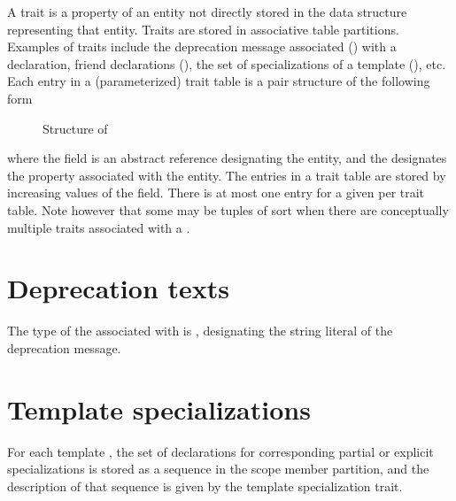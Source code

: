 \label{sec:ifc-traits}

A trait is a property of an entity not directly stored in the data structure representing that entity.
Traits are stored in associative table partitions.  Examples of traits include the deprecation 
message associated () with a declaration,
friend declarations (), the set of specializations of a 
template (), etc.
 Each entry in a (parameterized) trait table is a pair structure of the following form
\begin{figure}[H]
	\centering
	\caption{Structure of }
	\label{fig:ifc-associated-trait-structure}
\end{figure}
%
where the  field is an abstract reference designating the entity, and the  designates the property associated with the entity.
The entries in a trait table are stored by increasing values of the  field.  There is at most one entry for a given  per trait
table.  Note however that some  may be tuples of sort  when there are conceptually multiple traits associated with a .

\section{Deprecation texts}
\label{sec:ifc-deprecated-trait}

The type  of the  associated with  is , designating
the string literal of the deprecation message.




\section{Template specializations}
\label{sec:ifc-specialization-trait}

For each template , the set of declarations for corresponding partial or explicit specializations
is stored as a sequence in the scope member partition, and the description of that sequence is given by the template specialization trait.


